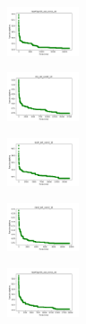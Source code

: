 \begin{figure}[H]
\begin{subfigure}
    \end{subfigure}
    \hfill
    \begin{subfigure}
        \centering
        \includegraphics[width=0.234\textwidth]{img/hs/newthyroid_set_const_10_277451237_cost.png}
    \end{subfigure}
    \hfill
    \begin{subfigure}
        \centering
        \includegraphics[width=0.234\textwidth]{img/hs/iris_set_const_10_49258669_cost.png}
    \end{subfigure}
    \hfill
    \begin{subfigure}
        \centering
        \includegraphics[width=0.234\textwidth]{img/hs/ecoli_set_const_10_49258669_cost.png}
    \end{subfigure}
    \hfill
    \begin{subfigure}
        \centering
        \includegraphics[width=0.234\textwidth]{img/hs/rand_set_const_10_49258669_cost.png}
    \end{subfigure}
    \hfill
    \begin{subfigure}
        \centering
        \includegraphics[width=0.234\textwidth]{img/hs/newthyroid_set_const_10_49258669_cost.png}
    \end{subfigure}
    \hfill
    \begin{subfigure}

\end{subfigure}
\end{figure}
